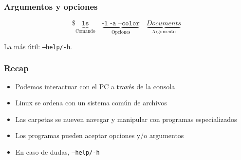 \documentclass[14pt,aspectratio=169,xcolor=dvipsnames]{beamer}
\begin{document}
\begin{frame}\frametitle{Argumentos y opciones}
    
    $$ \texttt{\$ }\underbrace{\texttt{ls}}_\text{Comando} \quad \underbrace{\texttt{-l -a --color}}_\text{Opciones} \quad \underbrace{Documents}_\text{Argumento} $$

La más útil: \texttt{--help/-h}. 

\vspace{1cm}
\end{frame}
\begin{frame}\frametitle{Recap}
    \begin{itemize}
        \item Podemos interactuar con el PC a través de la consola
        \item Linux se ordena con un sistema común de archivos
        \item Las carpetas se nueven navegar y manipular con programas especializados
        \item Los programas pueden aceptar opciones y/o argumentos
        \item En caso de dudas, \texttt{--help/-h}
    \end{itemize}
\end{frame}
\begin{frame}
    \maketitle
\end{frame}
\end{document}
